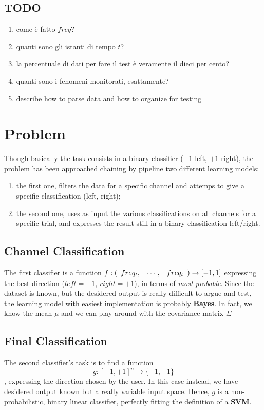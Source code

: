 \documentclass[10pt]{article}
\begin{document}
\subsection{TODO}
\begin{enumerate}
\item come \`e fatto $freq$?
\item quanti sono gli istanti di tempo $t$?
\item la percentuale di dati per fare il test \`e veramente il dieci per cento?
\item quanti sono i fenomeni monitorati, esattamente?
\item describe how to parse data and how to organize for testing
\end{enumerate}




\section{Problem}
Though basically the task consists in a binary classifier ($-1$ left, $+1$ right), the problem has been approached chaining by pipeline two different learning models:
\begin{enumerate}
\item the first one, filters the data for a specific channel and attemps to give a specific classification (left, right); 
\item the second one, uses as input the various classifications on all channels for a specific trial, and expresses the result still in a binary classification left/right.
\end{enumerate}


\subsection{Channel Classification}

The first classifier is a function
$ f: (\begin{array}{l l l} freq_t, & \cdots, & freq_t \end{array}) \to [-1, 1]  $
 expressing the best direction ($left=-1$, $right=+1$), in terms of \textit{most probable}. Since the dataset is known, but the desidered output is really difficult to argue and test, the learning model with easiest implementation is probably \textbf{Bayes}. In fact, we know the mean $\mu$ and we can play around with the covariance matrix $\Sigma$



\subsection{Final Classification}
The second classifier's task is to find a function
 $$
g: [-1, +1]^n \to \{-1, +1\}
$$
,  expressing the direction chosen by the user. In this case instead, we have desidered output known but a really variable input space. Hence, $g$ is a non-probabilistic, binary linear classifier, perfectly fitting the definition of a \textbf{SVM}.
\end{document}
